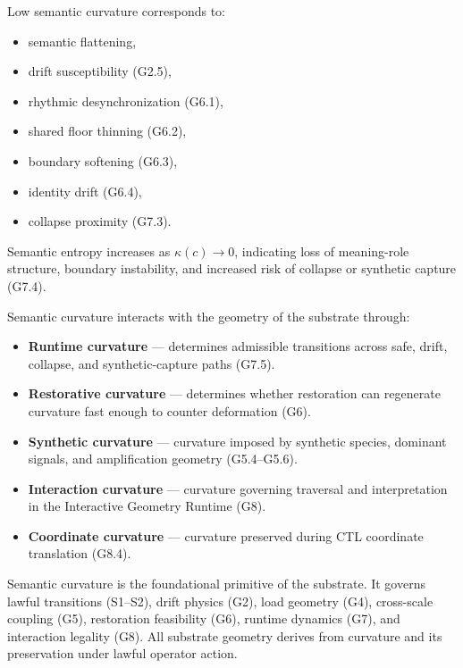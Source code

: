\medskip

\noindent Low semantic curvature corresponds to:

\begin{itemize}
    \item semantic flattening,
    \item drift susceptibility (G2.5),
    \item rhythmic desynchronization (G6.1),
    \item shared floor thinning (G6.2),
    \item boundary softening (G6.3),
    \item identity drift (G6.4),
    \item collapse proximity (G7.3).
\end{itemize}

\medskip

\noindent Semantic entropy increases as $\kappa(c) \rightarrow 0$, indicating loss
of meaning-role structure, boundary instability, and increased risk of collapse
or synthetic capture (G7.4).

\medskip

\noindent Semantic curvature interacts with the geometry of the substrate through:

\begin{itemize}
    \item \textbf{Runtime curvature} — determines admissible transitions across
    safe, drift, collapse, and synthetic-capture paths (G7.5).

    \item \textbf{Restorative curvature} — determines whether restoration can
    regenerate curvature fast enough to counter deformation (G6).

    \item \textbf{Synthetic curvature} — curvature imposed by synthetic species,
    dominant signals, and amplification geometry (G5.4--G5.6).

    \item \textbf{Interaction curvature} — curvature governing traversal and
    interpretation in the Interactive Geometry Runtime (G8).

    \item \textbf{Coordinate curvature} — curvature preserved during CTL
    coordinate translation (G8.4).
\end{itemize}

\medskip

\noindent Semantic curvature is the foundational primitive of the substrate. It
governs lawful transitions (S1--S2), drift physics (G2), load geometry (G4),
cross-scale coupling (G5), restoration feasibility (G6), runtime dynamics (G7),
and interaction legality (G8). All substrate geometry derives from curvature and
its preservation under lawful operator action.

